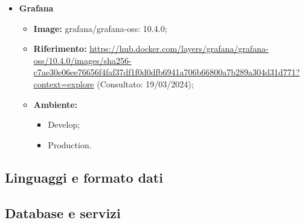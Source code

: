 \begin{itemize}
  \item \textbf{Grafana} 
    \begin{itemize}
      \item \textbf{Image:} grafana/grafana-oss: 10.4.0;
      \item \textbf{Riferimento:} \url{https://hub.docker.com/layers/grafana/grafana-oss/10.4.0/images/sha256-c7ae30e06ee76656f4faf37df1f0d0dfb6941a706b66800a7b289a304d31d771?context=explore} (Consultato: 19/03/2024);
      \item \textbf{Ambiente:}
        \begin{itemize}
          \item Develop;
          \item Production.
        \end{itemize}
    \end{itemize}
\end{itemize}

\subsection{Linguaggi e formato dati}





\subsection{Database e servizi}







